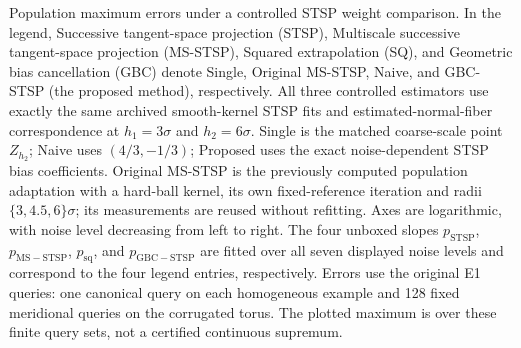 \caption{Population maximum errors under a controlled STSP weight comparison. In the legend, Successive tangent-space projection (STSP), Multiscale successive tangent-space projection (MS-STSP), Squared extrapolation (SQ), and Geometric bias cancellation (GBC) denote Single, Original MS-STSP, Naive, and GBC-STSP (the proposed method), respectively. All three controlled estimators use exactly the same archived smooth-kernel STSP fits and estimated-normal-fiber correspondence at $h_1=3\sigma$ and $h_2=6\sigma$. Single is the matched coarse-scale point $Z_{h_2}$; Naive uses $(4/3,-1/3)$; Proposed uses the exact noise-dependent STSP bias coefficients. Original MS-STSP is the previously computed population adaptation with a hard-ball kernel, its own fixed-reference iteration and radii $\{3,4.5,6\}\sigma$; its measurements are reused without refitting. Axes are logarithmic, with noise level decreasing from left to right. The four unboxed slopes $p_{\mathrm{STSP}}$, $p_{\mathrm{MS\!-\!STSP}}$, $p_{\mathrm{sq}}$, and $p_{\mathrm{GBC\!-\!STSP}}$ are fitted over all seven displayed noise levels and correspond to the four legend entries, respectively. Errors use the original E1 queries: one canonical query on each homogeneous example and 128 fixed meridional queries on the corrugated torus. The plotted maximum is over these finite query sets, not a certified continuous supremum.}

